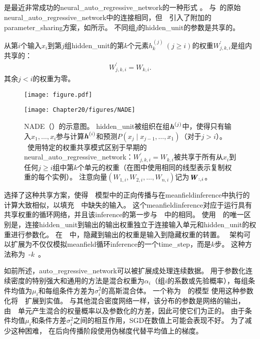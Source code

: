 
\subsection{}
\label{sec:nade}

是最近非常成功的\gls{neural_auto_regressive_network}的一种形式 \citep{Larochelle+Murray-2011-small}。
与~\citet{Bengio+Bengio-NIPS2000}的原始\gls{neural_auto_regressive_network}中的连接相同，但~~引入了附加的\gls{parameter_sharing}方案，如所示。
不同组$j$的\gls{hidden_unit}的参数是共享的。

从第$i$个输入$x_i$到第$j$组\gls{hidden_unit}的第$k$个元素$h_k^{(j)} ~(j \geq i)$的权重$W_{j,k,i}^{'}$是组内共享的：
\begin{align}
 W_{j,k,i}^{'} = W_{k,i}.
\end{align}
其余$j<i$的权重为零。


\begin{figure}[!htb]
\ifOpenSource
\centerline{\texttt{[image: figure.pdf]}}
\else
\centerline{\texttt{[image: Chapter20/figures/NADE]}}
\fi
\caption{\gls{NADE}（）的示意图。
\gls{hidden_unit}被组织在组$\boldsymbol{\mathit{h}}^{(j)}$中，使得只有输入$x_1,\dots,x_i$参与计算$\boldsymbol{\mathit{h}}^{(i)}$和预测$P(x_j \mid x_{j-1},\dots,x_1)$（对于$j> i$）。
~使用特定的权重共享模式区别于早期的\gls{neural_auto_regressive_network}：$W_{j,k,i}^{'} = W_{k,i}$被共享于所有从$x_i$到任何$j \geq i$组中第$k$个单元的权重（在图中使用相同的线型表示复制权重的每个实例）。 
注意向量$(W_{1,i}, W_{2,i},\dots,W_{n,i})$记为$\boldsymbol{\mathit{W}}_{:,i}$。
}
\label{fig:chap20_NADE}
\end{figure}


\citet{Larochelle+Murray-2011-small} 选择了这种共享方案，使得~~模型中的正向传播与在\gls{meanfield}\gls{inference}中执行的计算大致相似，以填充~~中缺失的输入。
这个\gls{meanfield}\gls{inference}对应于运行具有共享权重的循环网络，并且该\gls{inference}的第一步与~~中的相同。
使用~~的唯一区别是，连接\gls{hidden_unit}到输出的输出权重独立于连接输入单元和\gls{hidden_unit}的权重进行参数化。
在~~中，隐藏到输出的权重是输入到隐藏权重的转置。
~架构可以扩展为不仅仅模拟\gls{meanfield}循环\gls{inference}的一个\gls{time_step}，而是$k$步。
这种方法称为~-$k$~\citep{Raiko-et-al-2014}。


如前所述，\gls{auto_regressive_network}可以被扩展成处理连续数据。
用于参数化连续密度的特别强大和通用的方法是混合权重为$\alpha_i$（组$i$的系数或先验概率），每组条件均值为$\mu_i$和每组条件方差为$\sigma_i^2$的高斯混合体。
一个称为~~的模型\citep{Benigno-et-al-NIPS2013-small} 使用这种参数化将~~扩展到实值。
与其他混合密度网络一样，该分布的参数是网络的输出，由~~单元产生混合的权量概率以及参数化的方差，因此可使它们为正的。
由于条件均值$\mu_i$和条件方差$\sigma_i^2$之间的相互作用，\gls{SGD}在数值上可能会表现不好。
为了减少这种困难， \citet{Benigno-et-al-NIPS2013-small}在后向传播阶段使用伪梯度代替平均值上的梯度。

